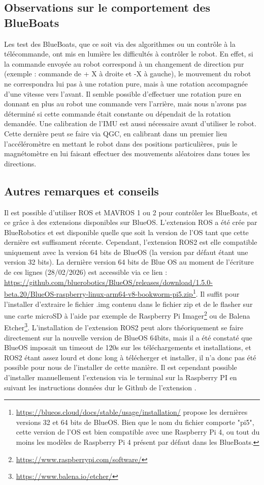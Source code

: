 \subsection{Observations sur le comportement des BlueBoats}

    Les test des BlueBoats, que ce soit via des algorithmes ou un contrôle à la télécommande, ont mis en lumière les difficultés à contrôler le robot. En effet, si la commande envoyée au robot correspond à un changement de direction pur (exemple : commande de + X à droite et -X à gauche), le mouvement du robot ne correspondra lui pas à une rotation pure, mais à une rotation accompagnée d'une vitesse vers l'avant. Il semble possible d'effectuer une rotation pure en donnant en plus au robot une commande vers l'arrière, mais nous n'avons pas déterminé si cette commande était constante ou dépendait de la rotation demandée. 
    Une calibration de l'IMU est aussi nécessaire avant d'utiliser le robot. Cette dernière peut se faire via QGC, en calibrant dans un premier lieu l'accéléromètre en mettant le robot dans des positions particulières, puis le magnétomètre en lui faisant effectuer des mouvements aléatoires dans toues les directions.

\subsection{Autres remarques et conseils}

    Il est possible d'utiliser ROS et MAVROS 1 ou 2 pour contrôler les BlueBoats, et ce grâce à des extensions disponibles sur BlueOS. L'extension ROS a été crée par BlueRobotics et est disponible quelle que soit la version de l'OS tant que cette dernière est suffisament récente. Cependant, l'extension ROS2 est elle compatible uniquement avec la version 64 bits de BlueOS (la version par défaut étant une version 32 bits). La dernière version 64 bits de Blue OS au moment de l'écriture de ces lignes (28/02/2026) est accessible via ce lien : \url{https://github.com/bluerobotics/BlueOS/releases/download/1.5.0-beta.20/BlueOS-raspberry-linux-arm64-v8-bookworm-pi5.zip}\footnote{\url{https://blueos.cloud/docs/stable/usage/installation/} propose les dernières versions 32 et 64 bits de BlueOS. Bien que le nom du fichier comporte "pi5", cette version de l'OS est bien compatible avec une Raspberry Pi 4, ou tout du moins les modèles de Raspberry Pi 4 présent par défaut dans les BlueBoats.}. Il suffit pour l'installer d'extraire le fichier .img contenu dans le fichier zip et de le flasher sur une carte microSD à l'aide par exemple de Raspberry Pi Imager\footnote{\url{https://www.raspberrypi.com/software/}} ou de Balena Etcher\footnote{\url{https://www.balena.io/etcher/}}. L'installation de l'extension ROS2 peut alors théoriquement se faire directement sur la nouvelle version de BlueOS 64bits, mais il a été constaté que BlueOS imposait un timeout de 120s sur les téléchargements et installations, et ROS2 étant assez lourd et donc long à télécherger et installer, il n'a donc pas été possible pour nous de l'installer de cette manière. Il est cependant possible d'installer manuellement l'extension via le terminal sur la Raspberry PI en suivant les instructions données dur le Github de l'extension \cite{github_ros2}.

